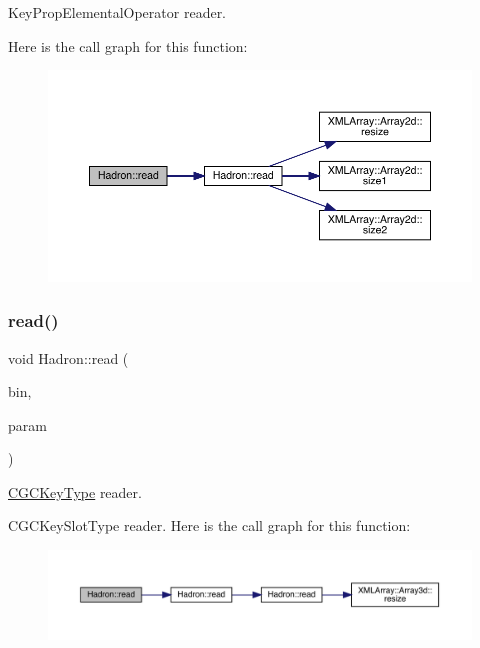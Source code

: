 Key\+Prop\+Elemental\+Operator reader. 

Here is the call graph for this function\+:\nopagebreak
\begin{figure}[H]
\begin{center}
\leavevmode
\includegraphics[width=350pt]{d1/daf/namespaceHadron_ac7fbe05fdb59de181eed9428364667e3_cgraph}
\end{center}
\end{figure}
\mbox{\label{namespaceHadron_a0fa916d0de711ad2cf389173ad463f51}} 
\subsubsection{\texorpdfstring{read()}{read()}\hspace{0.1cm}{\footnotesize\ttfamily [25/94]}}
{\footnotesize\ttfamily void Hadron\+::read (\begin{DoxyParamCaption}\item[{\mbox{\hyperlink{classADATIO_1_1BinaryReader}{Binary\+Reader}} \&}]{bin,  }\item[{\mbox{\hyperlink{structHadron_1_1KeyCGCIrrepMom__t}{Key\+C\+G\+C\+Irrep\+Mom\+\_\+t}} \&}]{param }\end{DoxyParamCaption})}



\mbox{\hyperlink{structHadron_1_1CGCKeyType}{C\+G\+C\+Key\+Type}} reader. 

C\+G\+C\+Key\+Slot\+Type reader. Here is the call graph for this function\+:\nopagebreak
\begin{figure}[H]
\begin{center}
\leavevmode
\includegraphics[width=350pt]{d1/daf/namespaceHadron_a0fa916d0de711ad2cf389173ad463f51_cgraph}
\end{center}
\end{figure}
\mbox{\label{namespaceHadron_a1a172c91f55bd8989d9751c7f8b5ac28}} 
